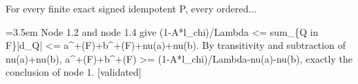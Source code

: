 \documentclass{article}
\newcommand{\step}[1]{\par\noindent\hangindent=3.5em\hangafter=1%
  \makebox[3.5em][l]{\textbf{#1.}}}
\newcommand{\steptag}[1]{\hfill{\small\textsf{[#1]}}}
\begin{document}
\begin{proofbox}{For every finite exact signed idempotent P, every ordered...}
\step{1.5} Node 1.2 and node 1.4 give (1-A*l\_chi)/Lambda <= sum\_\{Q in F\}|d\_Q| <= a\textasciicircum{}+(F)+b\textasciicircum{}+(F)+nu(a)+nu(b). By transitivity and subtraction of nu(a)+nu(b), a\textasciicircum{}+(F)+b\textasciicircum{}+(F) >= (1-A*l\_chi)/Lambda-nu(a)-nu(b), exactly the conclusion of node 1. \steptag{validated} \\[4pt]
\end{proofbox}
\end{document}

